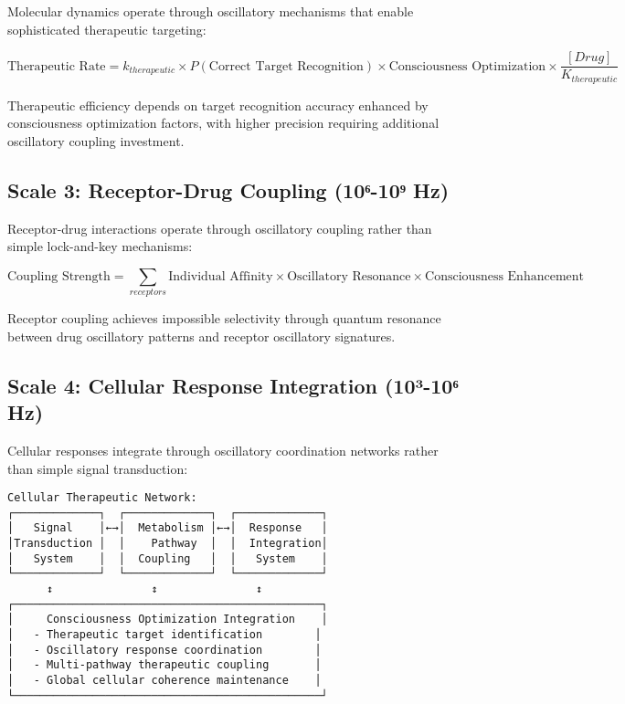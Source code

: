 \documentclass[12pt,a4paper]{article}
\begin{document}
Molecular dynamics operate through oscillatory mechanisms that enable sophisticated therapeutic targeting:

\begin{equation}
\text{Therapeutic Rate} = k_{therapeutic} \times P(\text{Correct Target Recognition}) \times \text{Consciousness Optimization} \times \frac{[Drug]}{K_{therapeutic}}
\end{equation}

Therapeutic efficiency depends on target recognition accuracy enhanced by consciousness optimization factors, with higher precision requiring additional oscillatory coupling investment.

\subsection{Scale 3: Receptor-Drug Coupling (10⁶-10⁹ Hz)}

Receptor-drug interactions operate through oscillatory coupling rather than simple lock-and-key mechanisms:

\begin{equation}
\text{Coupling Strength} = \sum_{receptors} \text{Individual Affinity} \times \text{Oscillatory Resonance} \times \text{Consciousness Enhancement}
\end{equation}

Receptor coupling achieves impossible selectivity through quantum resonance between drug oscillatory patterns and receptor oscillatory signatures.

\subsection{Scale 4: Cellular Response Integration (10³-10⁶ Hz)}

Cellular responses integrate through oscillatory coordination networks rather than simple signal transduction:

\begin{verbatim}
Cellular Therapeutic Network:
┌─────────────┐  ┌─────────────┐  ┌─────────────┐
│   Signal    │←→│  Metabolism │←→│  Response   │
│Transduction │  │    Pathway  │  │  Integration│
│   System    │  │  Coupling   │  │   System    │
└─────────────┘  └─────────────┘  └─────────────┘
      ↕               ↕               ↕
┌───────────────────────────────────────────────┐
│     Consciousness Optimization Integration    │
│   - Therapeutic target identification        │
│   - Oscillatory response coordination        │
│   - Multi-pathway therapeutic coupling       │
│   - Global cellular coherence maintenance    │
└───────────────────────────────────────────────┘
\end{verbatim}
\end{document}
